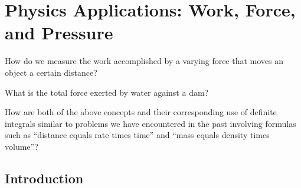 \section{Physics Applications:  Work, Force, and Pressure} \label{S:6.5.Physics}

\begin{goals}
  \item How do we measure the work accomplished by a varying force that moves an object a certain distance?
  \item What is the total force exerted by water against a dam?
  \item How are both of the above concepts and their corresponding use of definite integrals similar to problems we have encountered in the past involving formulas such as ``distance equals rate times time'' and ``mass equals density times volume''?
\end{goals}

\subsection*{Introduction}


